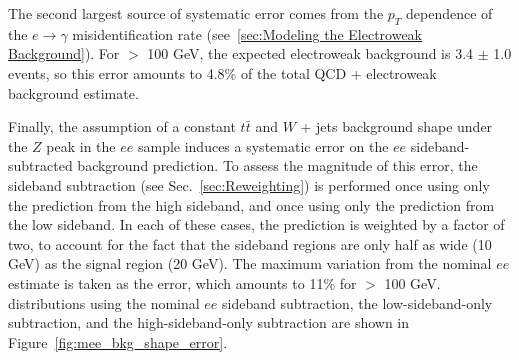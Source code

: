 \documentclass[dissertation.tex]{subfiles}
\begin{document}
The second largest source of systematic error comes from the $p_{T}$ dependence of the $e\rightarrow\gamma$ misidentification rate (see~\ref{sec:Modeling the Electroweak Background}).  For \MET $>$ 100 GeV, the expected electroweak background is 3.4 $\pm$ 1.0 events, so this error amounts to 4.8\% of the total QCD + electroweak background estimate.

Finally, the assumption of a constant $t\bar{t}$ and $W$ + jets background shape under the $Z$ peak in the $ee$ sample induces a systematic error on the $ee$ sideband-subtracted background prediction.  To assess the magnitude of this error, the sideband subtraction (see Sec.~\ref{sec:Reweighting}) is performed once using only the prediction from the high sideband, and once using only the prediction from the low sideband.  In each of these cases, the prediction is weighted by a factor of two, to account for the fact that the sideband regions are only half as wide (10 GeV) as the signal region (20 GeV).  The maximum variation from the nominal $ee$ estimate is taken as the error, which amounts to 11\% for \MET $>$ 100 GeV.  \MET distributions using the nominal $ee$ sideband subtraction, the low-sideband-only subtraction, and the high-sideband-only subtraction are shown in Figure~\ref{fig:mee_bkg_shape_error}.
\end{document}
